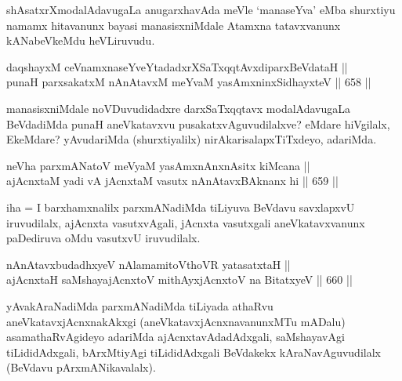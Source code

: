 \begin{artha}
shAsatxrXmodalAdavugaLa anugarxhavAda meVle `manaseYva' eMba shurxtiyu
namamx hitavanunx bayasi manasisxniMdale Atamxna tatavxvanunx
kANabeVkeMdu heVLiruvudu.
\end{artha}


\begin{shl}
daqshayxM ceVnamxnaseYveYtadadxrXSaTxqqtAvxdiparxBeVdataH || \\
punaH parxsakatxM nAnAtavxM meYvaM yasAmxninxSidhayxteV \hfill || 658 ||  
\end{shl}

\begin{artha}
manasisxniMdale noVDuvudidadxre darxSaTxqqtavx modalAdavugaLa
BeVdadiMda punaH aneVkatavxvu pusakatxvAguvudilalxve? eMdare
hiVgilalx, EkeMdare? yAvudariMda (shurxtiyalilx)
nirAkarisalapxTiTxdeyo, adariMda.
\end{artha}


\begin{shl}
neVha parxmANatoV meVyaM yasAmxnAnxnA\s sitx kiMcana || \\
ajAcnxtaM yadi vA jAcnxtaM vasutx nAnAtavxBAknanx hi \hfill || 659 ||  
\end{shl}

\begin{artha}
iha = I barxhamxnalilx parxmANadiMda tiLiyuva BeVdavu savxlapxvU iruvudilalx, ajAcnxta vasutxvAgali, jAcnxta vasutxgali aneVkatavxvanunx paDediruva oMdu vasutxvU iruvudilalx.
\end{artha}


\begin{shl}
nAnAtavxbudadhxyeV nAlamamitoV\s thoVR yatasatxtaH || \\
ajAcnxtaH saMshayajAcnxtoV mithAyxjAcnxtoV na BitatxyeV \hfill || 660 ||  
\end{shl}

\begin{artha}
yAvakAraNadiMda parxmANadiMda tiLiyada athaRvu aneVkatavxjAcnxnakAkxgi
(aneVkatavxjAcnxnavanunxMTu mADalu) asamathaRvAgideyo adariMda
ajAcnxtavAdadAdxgali, saMshayavAgi tiLididAdxgali, bArxMtiyAgi
tiLididAdxgali BeVdakekx kAraNavAguvudilalx (BeVdavu pArxmANikavalalx).
\end{artha}

